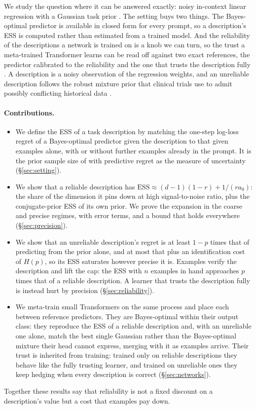 \documentclass[10pt]{article}
\newcommand{\ess}{\mathrm{ESS}}
\begin{document}
We study the question where it can be answered exactly: noisy in-context linear regression with a Gaussian task prior \citep{garg2022, akyurek2023, raventos2023}. The setting buys two things. The Bayes-optimal predictor is available in closed form for every prompt, so a description's ESS is computed rather than estimated from a trained model. And the reliability of the descriptions a network is trained on is a knob we can turn, so the trust a meta-trained Transformer learns can be read off against two exact references, the predictor calibrated to the reliability and the one that trusts the description fully \citep{genewein2025}. A description is a noisy observation of the regression weights, and an unreliable description follows the robust mixture prior that clinical trials use to admit possibly conflicting historical data \citep{schmidli2014}.

\paragraph{Contributions.}
\begin{itemize}
    \item We define the ESS of a task description by matching the one-step log-loss regret of a Bayes-optimal predictor given the description to that given examples alone, with or without further examples already in the prompt. It is the prior sample size of \citet{reimherr2021} with predictive regret as the measure of uncertainty (\S\ref{sec:setting}).
    \item We show that a reliable description has $\ess \approx (d-1)(1-r) + 1/(r a_0)$: the share of the dimension it pins down at high signal-to-noise ratio, plus the conjugate-prior ESS of its own prior. We prove the expansion in the coarse and precise regimes, with error terms, and a bound that holds everywhere (\S\ref{sec:precision}).
    \item We show that an unreliable description's regret is at least $1-p$ times that of predicting from the prior alone, and at most that plus an identification cost of $H(p)$, so its ESS saturates however precise it is. Examples verify the description and lift the cap: the ESS with $n$ examples in hand approaches $p$ times that of a reliable description. A learner that trusts the description fully is instead hurt by precision (\S\ref{sec:reliability}).
    \item We meta-train small Transformers on the same process and place each between reference predictors. They are Bayes-optimal within their output class: they reproduce the ESS of a reliable description and, with an unreliable one alone, match the best single Gaussian rather than the Bayes-optimal mixture their head cannot express, merging with it as examples arrive. Their trust is inherited from training: trained only on reliable descriptions they behave like the fully trusting learner, and trained on unreliable ones they keep hedging when every description is correct (\S\ref{sec:networks}).
\end{itemize}
Together these results say that reliability is not a fixed discount on a description's value but a cost that examples pay down.
\end{document}
